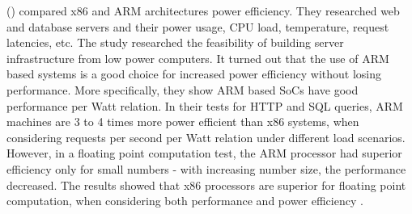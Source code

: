 \citeauthor{aroca2012towards} (\citeyear{aroca2012towards}) 
compared x86 and ARM architectures power efficiency.
They researched web and database servers and their power usage, CPU load,
temperature, request latencies, etc.
The study researched the feasibility of building server infrastructure
from low power computers. It turned out that the use of ARM based systems
is a good choice for increased power efficiency without losing performance.
More specifically, they show ARM based SoCs have good performance per Watt relation.
In their tests for HTTP and SQL queries, ARM machines are 3 to 4 times
more power efficient than x86 systems, when considering 
requests per second per Watt relation under different load scenarios.
However, in a floating point computation test, the ARM processor had 
superior efficiency only for small numbers - with increasing number size,
the performance decreased. The results showed that x86 processors are superior
for floating point computation, when considering both performance and 
power efficiency
\cite{aroca2012towards}.
